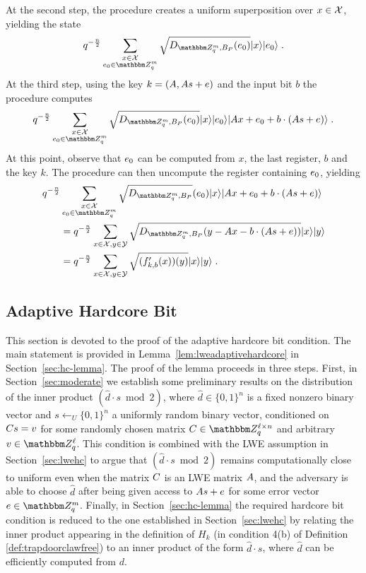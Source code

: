 \begin{enumerate}
At the second step, the procedure creates a uniform superposition over $x\in \mathcal{X}$, yielding the state
\begin{equation}
q^{-\frac{n}{2}}\sum_{\substack{x\in \sX \\ \*e_0\in \mZ_q^{m}}} \sqrt{D_{\mZ_q^m,B_P}(\*e_0)}\ket{x}\ket{\*e_0}\;.
\end{equation}
At the third step, using the key $k = (\*A,\*A\*s + \*e)$ and the input bit $b$ the procedure computes  
\begin{equation}\label{eq:priortoerasingerror}
q^{-\frac{n}{2}}\sum_{\substack{x\in \sX \\ \*e_0\in \mZ_q^{m}}} \sqrt{D_{\mZ_q^m,B_P}(\*e_0)}\ket{x}\ket{\*e_0}\ket{\*Ax + \*e_0 + b\cdot (\*A\*s + \*e)}\;.
\end{equation}
At this point, observe that $\*e_0$ can be computed from $x$, the last register, $b$ and the key $k$. The procedure can then uncompute the register containing $\*e_0$, yielding 
\begin{align}
q^{-\frac{n}{2}}&\sum_{\substack{x\in \sX \\ \*e_0\in \mZ_q^{m}}} \sqrt{D_{\mZ_q^m,B_P}}(\*e_0)\ket{x}\ket{\*Ax + \*e_0 + b\cdot (\*A\*s + \*e)}\nonumber\\
&=q^{-\frac{n}{2}}\sum_{x\in \sX , y\in \sY}\sqrt{D_{\mZ_q^m,B_P}(y - \*Ax - b\cdot(\*A\*s + \*e))}\ket{x}\ket{y}\nonumber\\
&=  q^{-\frac{n}{2}}\sum_{x\in \sX ,y\in\sY}\sqrt{(f'_{k,b}(x))(y)}\ket{x}\ket{y}\;.\label{eq:fprimestate}
\end{align}

\end{enumerate}




\subsection{Adaptive Hardcore Bit} 
\label{sec:adaptive-bit}
This section is devoted to the proof of the adaptive hardcore bit condition. The main statement is provided in Lemma~\ref{lem:lweadaptivehardcore} in Section~\ref{sec:hc-lemma}. The proof of the lemma proceeds in three steps. First, in Section~\ref{sec:moderate} we establish some preliminary results on the distribution of the inner product $(\hat{d}\cdot s \bmod 2)$, where $\hat{d}\in\{0,1\}^n$ is a fixed nonzero binary vector and $s\leftarrow_U \{0,1\}^n$ a uniformly random binary vector, conditioned on $\*C\*s=\*v$ for some randomly chosen matrix $\*C\in \mZ_q^{\ell\times n}$ and arbitrary $\*v\in\mZ_q^{\ell}$. This condition is combined with the LWE assumption in Section~\ref{sec:lwehc} to argue that  $(\hat{d}\cdot s \bmod 2)$ remains computationally close to uniform even when the matrix $\*C$ is an LWE matrix $\*A$, and the adversary is able to choose $\hat{d}$ after being given access to $\*A\*s+\*e$ for some error vector $\*e\in\mZ_q^m$. Finally, in Section~\ref{sec:hc-lemma} the required hardcore bit condition is reduced to the one established in  Section~\ref{sec:lwehc} by relating the inner product appearing in the definition of $H_k$ (in condition 4(b) of Definition \ref{def:trapdoorclawfree}) to an inner product of the form $\hat{d}\cdot s$, where $\hat{d}$ can be efficiently computed from $d$.  

